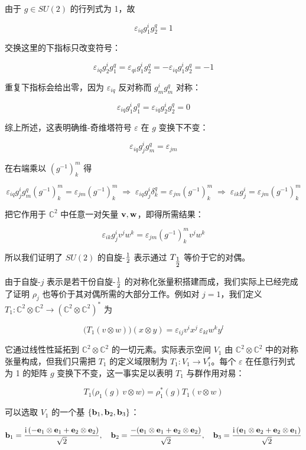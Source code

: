 由于 $g\in SU(2)$ 的行列式为 1，故

\[
\varepsilon_{iq}g^{i}_{1}g^{q}_{2}=1
\]

交换这里的下指标只改变符号：

\[
\varepsilon_{iq}g^{i}_{2}g^{q}_{1}=\varepsilon_{qi}g^{i}_{1}g^{q}_{2}=-\varepsilon_{iq}g^{i}_{1}g^{q}_{2}=-1
\]

重复下指标会给出零，因为 $\varepsilon_{iq}$ 反对称而 $g^{i}_{m}g^{q}_{m}$ 对称：

\[
\varepsilon_{iq}g^{i}_{1}g^{q}_{1}=\varepsilon_{iq}g^{i}_{2}g^{q}_{2}=0
\]

综上所述，这表明确维-奇维塔符号 $\varepsilon$ 在 $g$ 变换下不变：

\[
\varepsilon_{iq}g^{i}_{j}g^{q}_{m}=\varepsilon_{jm}
\]

在右端乘以 $(g^{-1})^{m}_{k}$ 得

\[
\varepsilon_{iq}g^{i}_{j}g^{q}_{m}(g^{-1})^{m}_{k}=\varepsilon_{jm}(g^{-1})^{m}_{k}
\;\Longrightarrow\;
\varepsilon_{iq}g^{i}_{j}\delta^{q}_{k}=\varepsilon_{jm}(g^{-1})^{m}_{k}
\;\Longrightarrow\;
\varepsilon_{ik}g^{i}_{j}=\varepsilon_{jm}(g^{-1})^{m}_{k}
\]

把它作用于 $\mathbb{C}^{2}$ 中任意一对矢量 $\mathbf{v},\mathbf{w}$，即得所需结果：

\[
\varepsilon_{ik}g^{i}_{j}v^{j}w^{k}=\varepsilon_{jm}(g^{-1})^{m}_{k}v^{j}w^{k}
\]

所以我们证明了 $SU(2)$ 的自旋-$\tfrac{1}{2}$ 表示通过 $T_{\tfrac{1}{2}}$ 等价于它的对偶。

由于自旋-$j$ 表示是若干份自旋-$\tfrac{1}{2}$ 的对称化张量积搭建而成，我们实际上已经完成了证明 $\rho_{j}$ 也等价于其对偶所需的大部分工作。例如对 $j=1$，我们定义 $T_{1}:\mathbb{C}^{2}\otimes\mathbb{C}^{2}\to(\mathbb{C}^{2}\otimes\mathbb{C}^{2})^{*}$ 为

\[
\bigl(T_{1}(v\otimes w)\bigr)(x\otimes y)=\varepsilon_{ij}v^{i}x^{j}\,\varepsilon_{kl}w^{k}y^{l}
\]

它通过线性性延拓到 $\mathbb{C}^{2}\otimes\mathbb{C}^{2}$ 的一切元素。实际表示空间 $V_{1}$ 由 $\mathbb{C}^{2}\otimes\mathbb{C}^{2}$ 中的对称张量构成，但我们只需把 $T_{1}$ 的定义域限制为 $T_{1}:V_{1}\to V_{1}^{*}$。每个 $\varepsilon$ 在任意行列式为 1 的矩阵 $g$ 变换下不变，这一事实足以表明 $T_{1}$ 与群作用对易：

\[
T_{1}\bigl(\rho_{1}(g)\,v\otimes w\bigr)=\rho_{1}^{*}(g)T_{1}(v\otimes w)
\]

可以选取 $V_{1}$ 的一个基 $\{\mathbf{b}_{1},\mathbf{b}_{2},\mathbf{b}_{3}\}$：

\[
\mathbf{b}_{1}=\frac{\mathrm{i}\,(-\mathbf{e}_{1}\otimes\mathbf{e}_{1}+\mathbf{e}_{2}\otimes\mathbf{e}_{2})}{\sqrt{2}},\quad
\mathbf{b}_{2}=\frac{-(\mathbf{e}_{1}\otimes\mathbf{e}_{1}+\mathbf{e}_{2}\otimes\mathbf{e}_{2})}{\sqrt{2}},\quad
\mathbf{b}_{3}=\frac{\mathrm{i}\,(\mathbf{e}_{1}\otimes\mathbf{e}_{2}+\mathbf{e}_{2}\otimes\mathbf{e}_{1})}{\sqrt{2}}
\]

